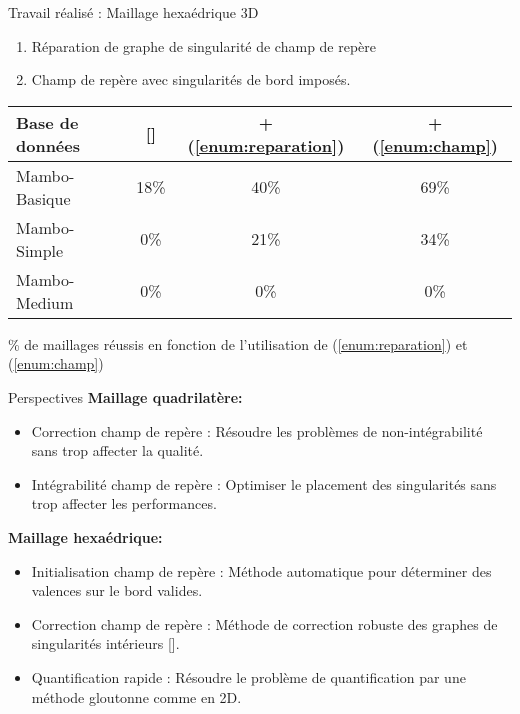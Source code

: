 \begin{frame}{Travail réalisé : Maillage hexaédrique 3D}
    \centering
    \begin{enumerate}
        \item Réparation de graphe de singularité de champ de repère \label{enum:reparation}
        \item Champ de repère avec singularités de bord imposés. \label{enum:champ}
    \end{enumerate}
    \begin{table}
    \centering
    \begin{tabular}{|l|c|c|c|}
    \hline
    Base de données & [\cite{ray_practical_2016}] & + (\ref{enum:reparation}) & + (\ref{enum:champ}) \\
    \hline
    Mambo-Basique & 18\% & 40\% & 69\% \\
    \hline
    Mambo-Simple & 0\% & 21\% & 34\% \\
    \hline
    Mambo-Medium & 0\% & 0\% & 0\% \\
    \hline
    \end{tabular}
    \end{table}
    \% de maillages réussis  en fonction de l'utilisation de (\ref{enum:reparation}) et (\ref{enum:champ})
\end{frame}

\begin{frame}{Perspectives}
    \textbf{Maillage quadrilatère:}
    \begin{itemize}
        \item Correction champ de repère : Résoudre les problèmes de non-intégrabilité sans trop affecter la qualité.
        \item Intégrabilité champ de repère : Optimiser le placement des singularités sans trop affecter les performances.
    \end{itemize}
    \pause
    \textbf{Maillage hexaédrique:}
    \begin{itemize}
        \item Initialisation champ de repère : Méthode automatique pour déterminer des valences sur le bord valides.
        \item Correction champ de repère : Méthode de correction robuste des graphes de singularités intérieurs [\cite{liu2023locally}].
        \item Quantification rapide : Résoudre le problème de quantification par une méthode gloutonne comme en 2D.
    \end{itemize}
\end{frame}
